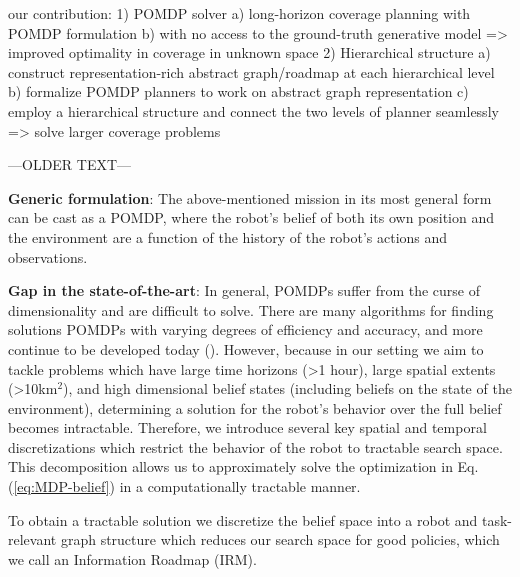 \documentclass{article}
\newcommand{\ph}[1]{{\textbf{#1}:}} %
\begin{document}
our contribution:
1) POMDP solver
  a) long-horizon coverage planning with POMDP formulation 
  b) with no access to the ground-truth generative model
  => improved optimality in coverage in unknown space
2) Hierarchical structure
  a) construct representation-rich abstract graph/roadmap at each hierarchical level
  b) formalize POMDP planners to work on abstract graph representation
  c) employ a hierarchical structure and connect the two levels of planner seamlessly
  => solve larger coverage problems


---OLDER TEXT---

\ph{Generic formulation}
The above-mentioned mission in its most general form can be cast as a POMDP, where the robot's belief of both its own position and the environment are a function of the history of the robot's actions and observations.  

\ph{Gap in the state-of-the-art}
In general, POMDPs suffer from the curse of dimensionality and are difficult to solve.  There are many algorithms for finding solutions POMDPs with varying degrees of efficiency and accuracy, and more continue to be developed today (\cite{silver2010monte,somani2013despot,bonet1998learning,kim2019pomhdp}).  However, because in our setting we aim to tackle problems which have large time horizons (>1 hour), large spatial extents (>10km$^2$), and high dimensional belief states (including beliefs on the state of the environment), determining a solution for the robot's behavior over the full belief becomes intractable.  Therefore, we introduce several key spatial and temporal discretizations which restrict the behavior of the robot to tractable search space.  This decomposition allows us to approximately solve the optimization in Eq. (\ref{eq:MDP-belief}) in a computationally tractable manner.

To obtain a tractable solution we discretize the belief space into a robot and task-relevant graph structure which reduces our search space for good policies, which we call an Information Roadmap (IRM).
\end{document}
